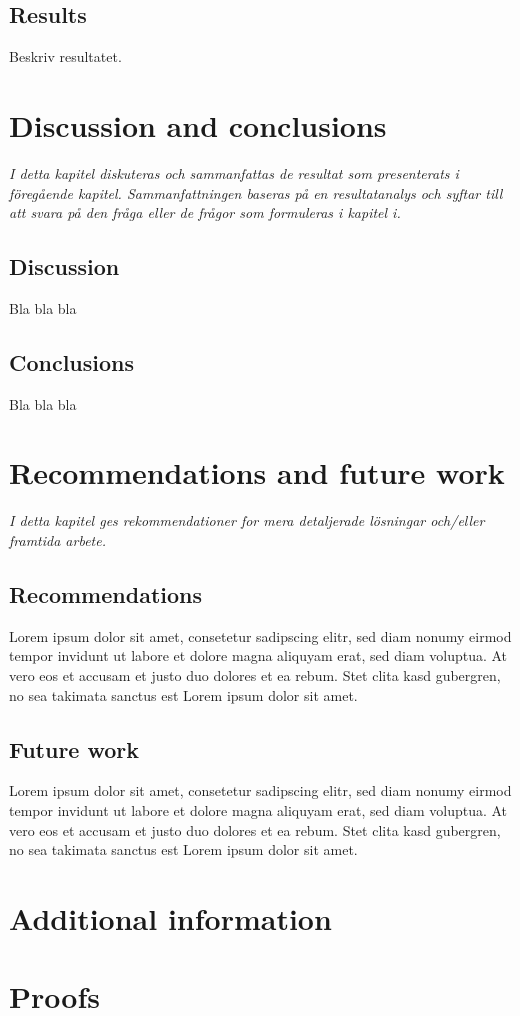 \documentclass[a4paper,11pt]{kth-mag}
\begin{document}
\section{Results}
Beskriv resultatet.


\chapter{Discussion and conclusions}
\emph{I detta kapitel diskuteras och sammanfattas de resultat som presenterats i föregående kapitel. Sammanfattningen baseras på en resultatanalys och syftar till att svara på den fråga eller de frågor som formuleras i kapitel i.}

\section{Discussion}
Bla bla bla

\section{Conclusions}
Bla bla bla


\chapter{Recommendations and future work}
\emph{I detta kapitel ges rekommendationer for mera detaljerade lösningar och/eller framtida arbete.}

\section{Recommendations}
Lorem ipsum dolor sit amet, consetetur sadipscing elitr, sed diam nonumy eirmod tempor invidunt ut labore et dolore magna aliquyam erat, sed diam voluptua. At vero eos et accusam et justo duo dolores et ea rebum. Stet clita kasd gubergren, no sea takimata sanctus est Lorem ipsum dolor sit amet.

\section{Future work}
Lorem ipsum dolor sit amet, consetetur sadipscing elitr, sed diam nonumy eirmod tempor invidunt ut labore et dolore magna aliquyam erat, sed diam voluptua. At vero eos et accusam et justo duo dolores et ea rebum. Stet clita kasd gubergren, no sea takimata sanctus est Lorem ipsum dolor sit amet.

%
\cleardoublepage



\cleardoublepage
\appendix
{}


\chapter{Additional information} \label{appA}

\chapter{Proofs} \label{appB}

\cleardoublepage   
\cleartoverso %
%
\end{document}
